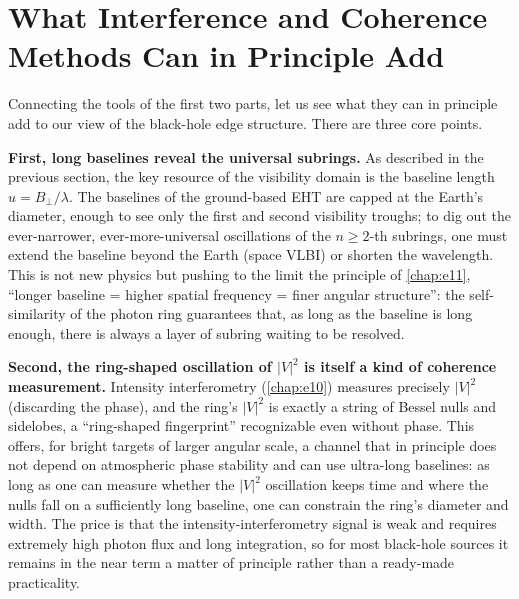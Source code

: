\section{What Interference and Coherence Methods Can in Principle Add}
\label{sec:e19-coherence}

Connecting the tools of the first two parts, let us see what they can in principle add to our view of the black-hole edge structure. There are three core points.

\textbf{First, long baselines reveal the universal subrings.} As described in the previous section, the key resource of the visibility domain is the baseline length \(u=B_\perp/\lambda\). The baselines of the ground-based EHT are capped at the Earth's diameter, enough to see only the first and second visibility troughs; to dig out the ever-narrower, ever-more-universal oscillations of the \(n\ge2\)-th subrings, one must extend the baseline beyond the Earth (space VLBI) or shorten the wavelength. This is not new physics but pushing to the limit the principle of \ref{chap:e11}, ``longer baseline = higher spatial frequency = finer angular structure'': the self-similarity of the photon ring guarantees that, as long as the baseline is long enough, there is always a layer of subring waiting to be resolved.

\textbf{Second, the ring-shaped oscillation of \(|V|^2\) is itself a kind of coherence measurement.} Intensity interferometry (\ref{chap:e10}) measures precisely \(|V|^2\) (discarding the phase), and the ring's \(|V|^2\) is exactly a string of Bessel nulls and sidelobes, a ``ring-shaped fingerprint'' recognizable even without phase. This offers, for bright targets of larger angular scale, a channel that in principle does not depend on atmospheric phase stability and can use ultra-long baselines: as long as one can measure whether the \(|V|^2\) oscillation keeps time and where the nulls fall on a sufficiently long baseline, one can constrain the ring's diameter and width. The price is that the intensity-interferometry signal is weak and requires extremely high photon flux and long integration, so for most black-hole sources it remains in the near term a matter of principle rather than a ready-made practicality.

